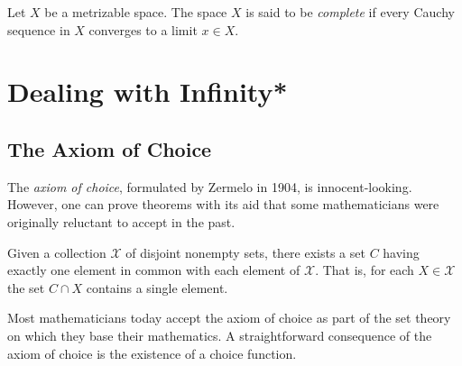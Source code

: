 \begin{definition}[Completeness]
Let $X$ be a metrizable space.
The space $X$ is said to be \emph{complete} if every Cauchy sequence in $X$ converges to a limit $x \in X$.
\end{definition}


\section{Dealing with Infinity*}

\subsection{The Axiom of Choice}

The \emph{axiom of choice}, formulated by Zermelo in 1904, is innocent-looking.
However, one can prove theorems with its aid that some mathematicians were originally reluctant to accept in the past.

\begin{definition}
Given a collection $\mathcal{X}$ of disjoint nonempty sets, there exists a set $C$ having exactly one element in common with each element of $\mathcal{X}$.
That is, for each $X \in \mathcal{X}$ the set $C \cap X$ contains a single element.
\end{definition}

Most mathematicians today accept the axiom of choice as part of the set theory on which they base their mathematics.
A straightforward consequence of the axiom of choice is the existence of a choice function.

